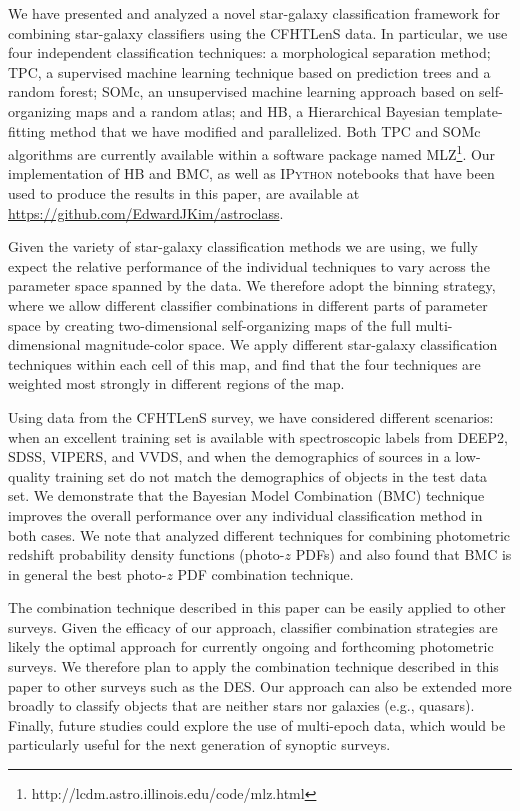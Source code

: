 \documentclass[useAMS,usenatbib]{mn2e}
\newcommand{\eg}{{e.g., }}
\begin{document}
We have presented and analyzed a novel star-galaxy classification framework
for combining star-galaxy classifiers using the CFHTLenS data.
In particular, we use four independent classification techniques:
a morphological separation method;
TPC, a supervised machine learning technique
based on prediction trees and a random forest;
SOMc, an unsupervised machine learning approach
based on self-organizing maps and a random atlas;
and HB, a Hierarchical Bayesian template-fitting method
that we have modified and parallelized.
Both TPC and SOMc algorithms are currently available within
a software package named
\textsc{MLZ}\footnote{http://lcdm.astro.illinois.edu/code/mlz.html}.
Our implementation of HB and BMC,
as well as \textsc{IPython} notebooks that have been used to
produce the results in this paper,
are available at \url{https://github.com/EdwardJKim/astroclass}.  

Given the variety of star-galaxy classification methods we are using,
we fully expect the relative performance
of the individual techniques to vary across
the parameter space spanned by the data.
We therefore adopt the binning strategy, where
we allow different classifier combinations 
in different parts of parameter space
by creating two-dimensional self-organizing maps of
the full multi-dimensional magnitude-color space.
We apply different star-galaxy classification techniques
within each cell of this map,
and find that the four techniques are weighted most strongly
in different regions of the map.   

Using data from the CFHTLenS survey,
we have considered different scenarios:
when an excellent training set is available with spectroscopic labels from
DEEP2, SDSS, VIPERS, and VVDS, and
when the demographics of sources in a low-quality training set
do not match the demographics of objects in the test data set.
We demonstrate that the Bayesian Model Combination (BMC) technique improves
the overall performance over any individual classification method
in both cases.
We note that \citet{carrascokind2014exhausting} analyzed
different techniques for combining
photometric redshift probability density functions (photo-$z$ PDFs)
and also found that BMC is in general the best
photo-$z$ PDF combination technique.   


The combination technique described in this paper
can be easily applied to other surveys.
Given the efficacy of our approach,
classifier combination strategies are likely the optimal approach
for currently ongoing and forthcoming photometric surveys.
We therefore plan to apply the combination technique described in this paper
to other surveys such as the DES.
Our approach can also be extended more broadly to
classify objects that are neither stars nor galaxies (\eg quasars).
Finally, future studies could explore the use of multi-epoch data,
which would be particularly useful for the next generation of
synoptic surveys.
\end{document}
